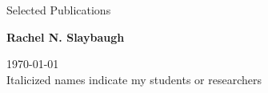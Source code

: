 \documentclass{resume2} %
\begin{document}

\begin{center}
{\Large Selected Publications}

{\large \textbf{Rachel N. Slaybaugh}}

\today\\
Italicized names indicate my students or researchers
\end{center} 

\end{document}
